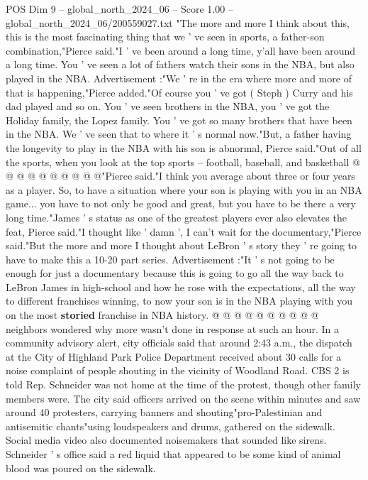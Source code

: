 \begin{textsample}{POS Dim 9 – global\_north\_2024\_06 – Score 1.00 – global\_north\_2024\_06/200559027.txt}  \label{ex:f9_pos_284}
"The more and more I think about this, this is the most fascinating thing that we ' ve seen in sports, a father-son combination,"Pierce said."I ' ve been around a long time, y'all have been around a long time.
You ' ve seen a lot of fathers watch their sons in the NBA, but also played in the NBA.
Advertisement :"We ' re in the era where more and more of that is happening,"Pierce added."Of course you ' ve got ( Steph ) Curry and his dad played and so on.
You ' ve seen brothers in the NBA, you ' ve got the Holiday family, the Lopez family.
You ' ve got so many brothers that have been in the NBA.
We ' ve seen that to where it ' s normal now."But, a father having the longevity to play in the NBA with his son is abnormal, Pierce said."Out of all the sports, when you look at the top sports -- football, baseball, and basketball @ @ @ @ @ @ @ @ @ @"Pierce said."I think you average about three or four years as a player.
So, to have a situation where your son is playing with you in an NBA game... you have to not only be good and great, but you have to be there a very long time."James ' s status as one of the greatest players ever also elevates the feat, Pierce said."I thought like ' damn ', I can't wait for the documentary,"Pierce said."But the more and more I thought about LeBron ' s story they ' re going to have to make this a 10-20 part series.
Advertisement :"It ' s not going to be enough for just a documentary because this is going to go all the way back to LeBron James in high-school and how he rose with the expectations, all the way to different franchises winning, to now your son is in the NBA playing with you on the most \textbf{storied} franchise in NBA history. @ @ @ @ @ @ @ @ @ @ neighbors wondered why more wasn't done in response at such an hour.
In a community advisory alert, city officials said that around 2:43 a.m., the dispatch at the City of Highland Park Police Department received about 30 calls for a noise complaint of people shouting in the vicinity of Woodland Road.
CBS 2 is told Rep.
Schneider was not home at the time of the protest, though other family members were.
The city said officers arrived on the scene within minutes and saw around 40 protesters, carrying banners and shouting"pro-Palestinian and antisemitic chants"using loudspeakers and drums, gathered on the sidewalk.
Social media video also documented noisemakers that sounded like sirens.
Schneider ' s office said a red liquid that appeared to be some kind of animal blood was poured on the sidewalk.

\end{textsample}
